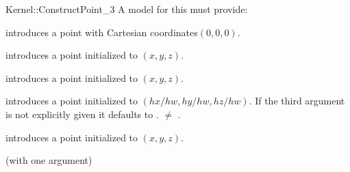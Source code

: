 \begin{ccRefFunctionObjectConcept}{Kernel::ConstructPoint_3}
A model for this must provide:


            {introduces a point with Cartesian coordinates$(0,0,0)$.}

\ccHidden{}
            {introduces a point  initialized to $(x,y,z)$.}

\ccHidden{}
            {introduces a point  initialized to $(x,y,z)$.}

\ccHidden{}
            {introduces a point  initialized to $(hx/hw,hy/hw, hz/hw)$.
             If the third argument is not explicitly given it defaults
             to .
             \ccPrecond {} $\neq$ . }

\ccHidden{}
            {introduces a point  initialized to $(x,y,z)$.}

\ccRefines
{} (with one argument)

\ccSeeAlso
{} \\

\end{ccRefFunctionObjectConcept}
